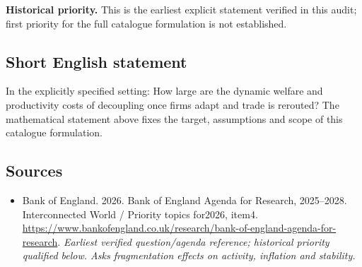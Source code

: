 \documentclass[11pt]{article}
\begin{document}
\par\textbf{Historical priority.} This is the earliest explicit statement verified in this audit; first priority for the full catalogue formulation is not established.

\subsection{Short English statement}
In the explicitly specified setting: How large are the dynamic welfare and productivity costs of decoupling once firms adapt and trade is rerouted? The mathematical statement above fixes the target, assumptions and scope of this catalogue formulation.

\subsection{Sources}
\begin{itemize}\raggedright
\item[\textnormal{[S1]}]\hypertarget{source:30007626:1}{} Bank of England. 2026. Bank of England Agenda for Research, 2025–2028. Interconnected World / Priority topics for2026, item4.
\url{https://www.bankofengland.co.uk/research/bank-of-england-agenda-for-research}.
{\small\textit{Earliest verified question/agenda reference; historical priority qualified below. Asks fragmentation effects on activity, inflation and stability.}}
\end{itemize}
\end{document}
